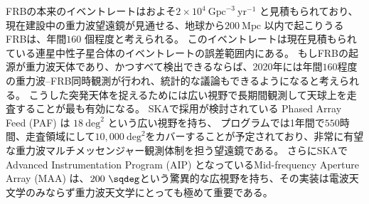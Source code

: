 FRBの本来のイベントレートはおよそ$2 \times 10^4~\text{Gpc}^{-3}~\text{yr}^{-1}$ と見積もられており、現在建設中の重力波望遠鏡が見通せる、地球から$200~\text{Mpc}$ 以内で起こりうるFRBは、年間$160$ 個程度と考えられる。
このイベントレートは現在見積もられている連星中性子星合体のイベントレートの誤差範囲内にある。
もしFRBの起源が重力波天体であり、かつすべて検出できるならば、2020年には年間$160$程度の重力波--FRB同時観測が行われ、統計的な議論もできるようになると考えられる。
こうした突発天体を捉えるためには広い視野で長期間観測して天球上を走査することが最も有効になる。
SKAで採用が検討されている Phased Array Feed (PAF) は $18~\text{deg}^2$ という広い視野を持ち、 プログラムでは1年間で$550$時間、走査領域にして$10,000~\text{deg}^2$をカバーすることが予定されており、非常に有望な重力波マルチメッセンジャー観測体制を担う望遠鏡である。
さらにSKAでAdvanced Instrumentation Program (AIP) となっているMid-frequency Aperture Array (MAA) は、$200~\sqdeg$という驚異的な広視野を持ち、その実装は電波天文学のみならず重力波天文学にとっても極めて重要である。
